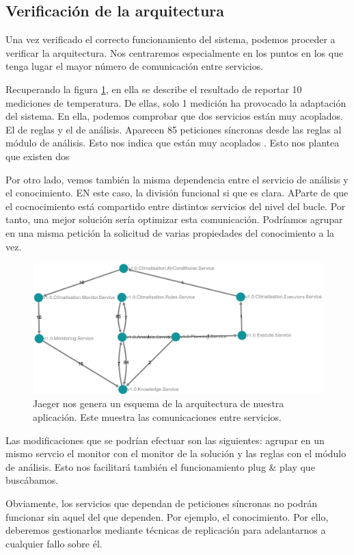 \subsection{Verificación de la arquitectura}

Una vez verificado el correcto funcionamiento del sistema, podemos proceder a verificar la arquitectura. Nos centraremos especialmente en los puntos en los que tenga lugar el mayor número de comunicación entre servicios.

Recuperando la figura \ref{fig:jaeger-arquitectura-inferida}, en ella se describe el resultado de reportar 10 mediciones de temperatura. De ellas, solo 1 medición ha provocado la adaptación del sistema. En ella, podemos comprobar que dos servicios están muy acoplados. El de reglas y el de análisis. Aparecen 85 peticiones síncronas desde las reglas al módulo de análisis. Esto nos indica que están muy acoplados \cite{singjaiPatternsDerivingAPIs2021}. Esto nos plantea que existen dos

Por otro lado, vemos también la misma dependencia entre el servicio de análisis y el conocimiento. EN este caso, la división funcional si que es clara. AParte de que el cocnocimiento está compartido entre distintos servicios del nivel del bucle. Por tanto, una mejor solución sería optimizar esta comunicación. Podríamos agrupar en una misma petición la solicitud de varias propiedades del conocimiento a la vez.

\begin{figure}[htb]
  \hspace{1.25cm}
  \includegraphics[scale=0.3]{cap_despliegue/images/Jaeger-arquitectura-climatizacion}
  \caption{Jaeger nos genera un esquema de la arquitectura de nuestra aplicación. Este muestra las comunicaciones entre servicios.}
  \label{fig:jaeger-arquitectura-inferida}
\end{figure}

Las modificaciones que se podrían efectuar son las siguientes: agrupar en un mismo servcio el  monitor con el monitor de la solución y las reglas con el módulo de análisis. Esto nos facilitará también el funcionamiento plug \& play que buscábamos.


Obviamente, los servicios que dependan de peticiones síncronas no podrán funcionar sin aquel del que dependen. Por ejemplo, el conocimiento. Por ello, deberemos gestionarlos mediante técnicas de replicación para adelantarnos a cualquier fallo sobre él.
